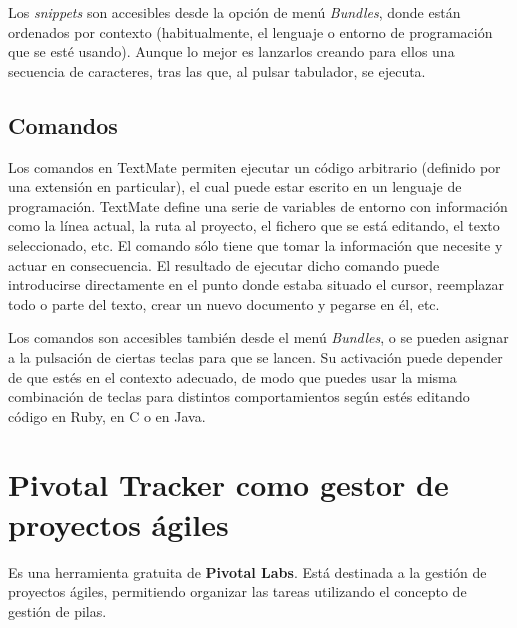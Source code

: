     Los {\it snippets} son accesibles desde la opción de menú {\it Bundles}, donde están ordenados por contexto (habitualmente, el lenguaje o entorno de programación que se esté usando). Aunque lo mejor es lanzarlos creando para ellos una secuencia de caracteres, tras las que, al pulsar tabulador, se ejecuta.

  
  \subsection{Comandos} %
    \label{sub:textmate_comandos}
    
    Los comandos en TextMate permiten ejecutar un código arbitrario (definido por una extensión en particular), el cual puede estar escrito en un lenguaje de programación. TextMate define una serie de variables de entorno con información como la línea actual, la ruta al proyecto, el fichero que se está editando, el texto seleccionado, etc. El comando sólo tiene que tomar la información que necesite y actuar en consecuencia. El resultado de ejecutar dicho comando puede introducirse directamente en el punto donde estaba situado el cursor, reemplazar todo o parte del texto, crear un nuevo documento y pegarse en él, etc.

    Los comandos son accesibles también desde el menú {\it Bundles}, o se pueden asignar a la pulsación de ciertas teclas para que se lancen. Su activación puede depender de que estés en el contexto adecuado, de modo que puedes usar la misma combinación de teclas para distintos comportamientos según estés editando código en Ruby, en C o en Java. 
    


\section{Pivotal Tracker como gestor de proyectos ágiles} %
  \label{sec:pivotaltracker_como_gestor_de_proyectos_agiles}

  Es una herramienta gratuita de {\bf Pivotal Labs}. Está destinada a la gestión de proyectos ágiles, permitiendo organizar las tareas utilizando el concepto de gestión de pilas.
  
